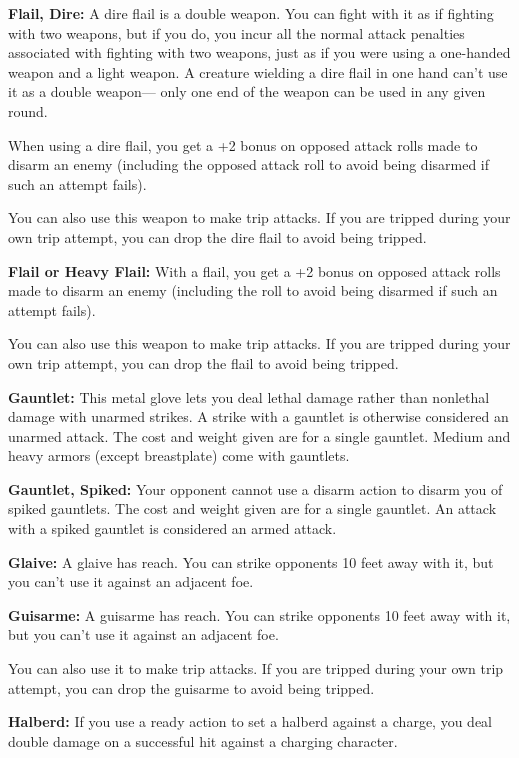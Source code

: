 \documentclass{article}
\begin{document}
\textbf{Flail, Dire: }A dire flail is a double weapon. You can fight with it as 
if fighting with two weapons, but if you do, you incur all the normal attack penalties 
associated with fighting with two weapons, just as if you were using a one-handed 
weapon and a light weapon. A creature wielding a dire flail in one hand can't use 
it as a double weapon--- only one end of the weapon can be used in any given round.

When using a dire flail, you get a +2 bonus on opposed attack rolls made to disarm 
an enemy (including the opposed attack roll to avoid being disarmed if such an 
attempt fails).

You can also use this weapon to make trip attacks. If you are tripped during your 
own trip attempt, you can drop the dire flail to avoid being tripped.

\textbf{Flail or Heavy Flail:} With a flail, you get a +2 bonus on opposed attack 
rolls made to disarm an enemy (including the roll to avoid being disarmed if such 
an attempt fails).

You can also use this weapon to make trip attacks. If you are tripped during your 
own trip attempt, you can drop the flail to avoid being tripped.

\textbf{Gauntlet:} This metal glove lets you deal lethal damage rather than nonlethal 
damage with unarmed strikes. A strike with a gauntlet is otherwise considered an 
unarmed attack. The cost and weight given are for a single gauntlet. Medium and 
heavy armors (except breastplate) come with gauntlets.

\textbf{Gauntlet, Spiked:} Your opponent cannot use a disarm action to disarm you 
of spiked gauntlets. The cost and weight given are for a single gauntlet. An attack 
with a spiked gauntlet is considered an armed attack.

\textbf{Glaive:} A glaive has reach. You can strike opponents 10 feet away with 
it, but you can't use it against an adjacent foe.

\textbf{Guisarme: }A guisarme has reach. You can strike opponents 10 feet away 
with it, but you can't use it against an adjacent foe.

You can also use it to make trip attacks. If you are tripped during your own trip 
attempt, you can drop the guisarme to avoid being tripped.

\textbf{Halberd:} If you use a ready action to set a halberd against a charge, 
you deal double damage on a successful hit against a charging character.
\end{document}
